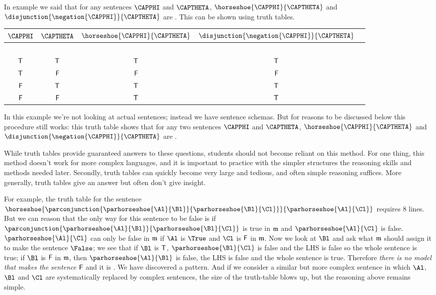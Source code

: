 \begin{majorILnc}{}
In example  we said that for any \GSL{} sentences $\CAPPHI$ and $\CAPTHETA$, $\horseshoe{\CAPPHI}{\CAPTHETA}$ and $\disjunction{\negation{\CAPPHI}}{\CAPTHETA}$ are . 
This can be shown using truth tables. 
\begin{center}
\begin{tabular}{ c c c c c }
$\CAPPHI$ & $\CAPTHETA$ & $\horseshoe{\CAPPHI}{\CAPTHETA}$ & $\disjunction{\negation{\CAPPHI}}{\CAPTHETA}$ & \\
\hline
$ $ & $ $ & & & \\[-.25cm]
$\mathsf{T}$ & $\mathsf{T}$ & $\mathsf{T}$ & $\mathsf{T}$ \\
$\mathsf{T}$ & $\mathsf{F}$& $\mathsf{F}$ & $\mathsf{F}$ \\
$\mathsf{F}$ & $\mathsf{T}$ & $\mathsf{T}$ & $\mathsf{T}$\\
$\mathsf{F}$ & $\mathsf{F}$  & $\mathsf{T}$ & $\mathsf{T}$\\
\end{tabular}
\end{center}
In this example we're not looking at actual \GSL{} sentences; instead we have sentence schemas. 
But for reasons to be discussed below this procedure still works: this truth table shows that for any two sentences $\CAPPHI$ and $\CAPTHETA$, $\horseshoe{\CAPPHI}{\CAPTHETA}$ and $\disjunction{\negation{\CAPPHI}}{\CAPTHETA}$ are .
\end{majorILnc}
While truth tables provide guaranteed answers to these questions, students should not become reliant on this method. 
For one thing, this method doesn't work for more complex languages, and it is important to practice with the simpler \GSL{} structures the reasoning skills and methods needed later. 
Secondly, truth tables can quickly become very large and tedious, and often simple reasoning suffices. 
More generally, truth tables give an answer but often don’t give insight.

For example, the truth table for the sentence $\horseshoe{\parconjunction{\parhorseshoe{\Al}{\Bl}}{\parhorseshoe{\Bl}{\Cl}}}{\parhorseshoe{\Al}{\Cl}}$ requires 8 lines. 
But we can reason that the only way for this sentence to be false is if $\parconjunction{\parhorseshoe{\Al}{\Bl}}{\parhorseshoe{\Bl}{\Cl}}$ is true in $\mathfrak{m}$ and $\parhorseshoe{\Al}{\Cl}$ is false. 
$\parhorseshoe{\Al}{\Cl}$ can only be false in $\mathfrak{m}$ if $\Al$ is $\True$ and $\Cl$ is $\mathsf{F}$ in $\mathfrak{m}$. 
Now we look at $\Bl$ and ask what $\mathfrak{m}$ should assign it to make the sentence $\False$; 
we see that if $\Bl$ is $\mathsf{T}$, $\parhorseshoe{\Bl}{\Cl}$ is false and the LHS is false so the whole sentence is true; 
if $\Bl$ is $\mathsf{F}$ in $\mathfrak{m}$, then $\parhorseshoe{\Al}{\Bl}$ is false, the LHS is false and the whole sentence is true. 
Therefore \emph{there is no model that makes the sentence $\mathsf{F}$} and it is . 
We have discovered a pattern. 
And if we consider a similar but more complex sentence in which $\Al$, $\Bl$ and $\Cl$ are systematically replaced by complex sentences, the size of the truth-table blows up, but the reasoning above remains simple.


